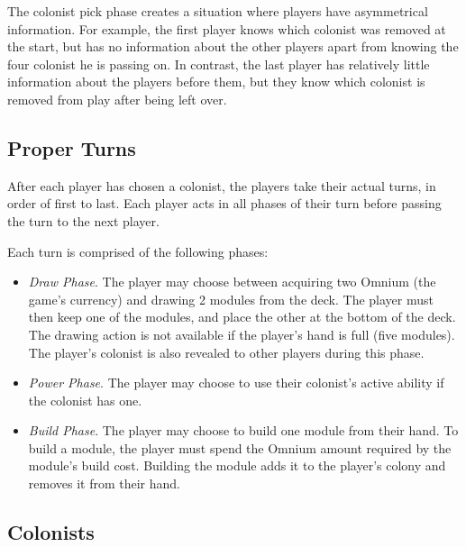 The colonist pick phase creates a situation where players have asymmetrical information.
For example, the first player knows which colonist was removed at the start, but has
no information about the other players apart from knowing the four colonist he is passing
on. In contrast, the last player has relatively little information about the players
before them, but they know which colonist is removed from play after being left over.

\pagebreak
\subsection{Proper Turns}

After each player has chosen a colonist, the players take their actual turns, in order
of first to last. Each player acts in all phases of their turn before passing the turn
to the next player.

Each turn is comprised of the following phases:
\begin{itemize}
    \item \emph{Draw Phase}. The player may choose between acquiring two Omnium
        (the game's currency) and drawing 2 modules from the deck. The player
        must then keep one of the modules, and place the other at the bottom of the deck.
        The drawing action is not available if the player's hand is full (five modules).
        The player's colonist is also revealed to other players during this phase.
    \item \emph{Power Phase}. The player may choose to use their colonist's active
        ability if the colonist has one.
    \item \emph{Build Phase}. The player may choose to build one module from their hand.
        To build a module, the player must spend the Omnium amount required by the module's
        build cost. Building the module adds it to the player's colony and removes
        it from their hand.
\end{itemize}

\subsection{Colonists}
\label{gamedesign:colonists}

